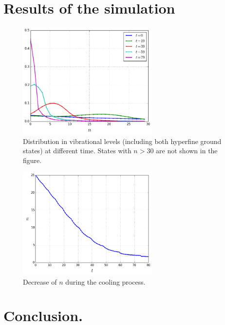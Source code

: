 \documentclass[aps,twocolumn,secnumarabic,balancelastpage,amsmath,amssymb,nofootinbib]{revtex4}
\begin{document}
\section{Results of the simulation}
\begin{figure}
  \begin{center}
    \includegraphics[width=7cm]{../cool_process.png}
  \end{center}
  \caption{Distribution in vibrational levels (including both hyperfine ground states) at different time. States with $n>30$ are not shown in the figure.}
  \label{fig-cool-process}
\end{figure}
\begin{figure}
  \begin{center}
    \includegraphics[width=7cm]{../n_decrease.png}
  \end{center}
  \caption{Decrease of $n$ during the cooling process.}
  \label{fig-n-decrease}
\end{figure}

\section{Conclusion.}


\end{document}

